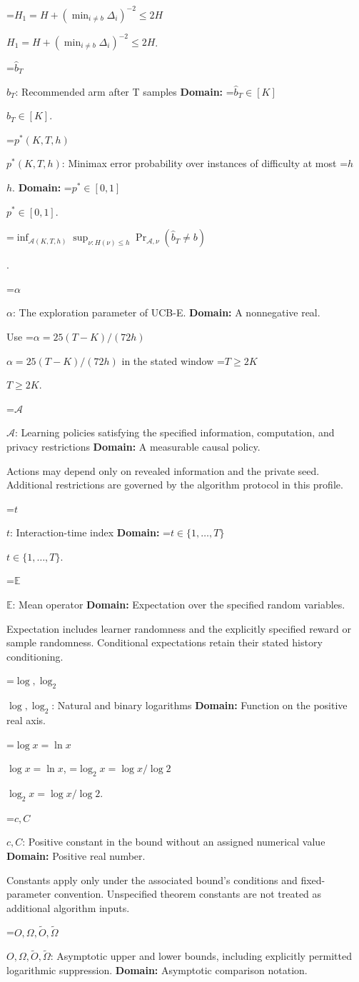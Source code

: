 \documentclass[10pt,a4paper]{article}
\newcommand{\AtlasMath}[1]{\par\begingroup\centering\setbox0=\hbox{$\displaystyle #1$}\ifdim\wd0>1.4\linewidth\typeout{ATLAS WIDE FORMULA: \the\wd0}\fi\ifdim\wd0>\linewidth\resizebox{\linewidth}{!}{\box0}\else\box0\fi\par\endgroup}
\newcommand{\AtlasInlineMath}[1]{\begingroup\setbox0=\hbox{$#1$}\ifdim\wd0>.4\linewidth\endgroup\AtlasMath{#1}\else\endgroup$#1$\fi}
\begin{document}
\AtlasInlineMath{H_1=H+(\min_{i\ne b}\Delta_i)^{-2}\le2H}.

\AtlasInlineMath{\widehat b_T}: Recommended arm after T samples \textbf{Domain:} \AtlasInlineMath{\widehat b_T\in[K]}.

\AtlasInlineMath{p^*(K,T,h)}: Minimax error probability over instances of difficulty at most \AtlasInlineMath{h}. \textbf{Domain:} \AtlasInlineMath{p^*\in[0,1]}.


\AtlasMath{\inf_{\mathcal A(K,T,h)}\sup_{\nu:H(\nu)\le h}\Pr_{\mathcal A,\nu}(\widehat b_T\ne b)}
.

\AtlasInlineMath{\alpha}: The exploration parameter of UCB-E. \textbf{Domain:} A nonnegative real.

Use \AtlasInlineMath{\alpha=25(T-K)/(72h)} in the stated window \AtlasInlineMath{T\ge2K}.

\AtlasInlineMath{\mathcal A}: Learning policies satisfying the specified information, computation, and privacy restrictions \textbf{Domain:} A measurable causal policy.

Actions may depend only on revealed information and the private seed. Additional restrictions are governed by the algorithm protocol in this profile.

\AtlasInlineMath{t}: Interaction-time index \textbf{Domain:} \AtlasInlineMath{t\in\{1,\ldots,T\}}.

\AtlasInlineMath{\mathbb E}: Mean operator \textbf{Domain:} Expectation over the specified random variables.

Expectation includes learner randomness and the explicitly specified reward or sample randomness. Conditional expectations retain their stated history conditioning.

\AtlasInlineMath{\log,\log_2}: Natural and binary logarithms \textbf{Domain:} Function on the positive real axis.

\AtlasInlineMath{\log x=\ln x}, \AtlasInlineMath{\log_2x=\log x/\log2}.

\AtlasInlineMath{c,C}: Positive constant in the bound without an assigned numerical value \textbf{Domain:} Positive real number.

Constants apply only under the associated bound’s conditions and fixed-parameter convention. Unspecified theorem constants are not treated as additional algorithm inputs.

\AtlasInlineMath{O,\Omega,\widetilde O,\widetilde\Omega}: Asymptotic upper and lower bounds, including explicitly permitted logarithmic suppression. \textbf{Domain:} Asymptotic comparison notation.
\end{document}
